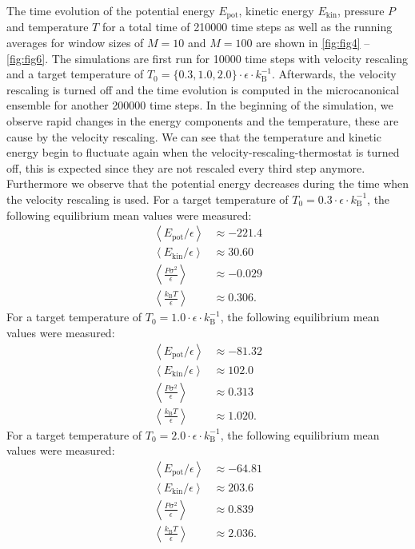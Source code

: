 \documentclass[a4paper,10pt,bibtotoc]{scrartcl}
\begin{document}
The time evolution of the potential energy $E_\mathrm{pot}$, kinetic energy $E_\mathrm{kin}$, pressure $P$ and temperature $T$ for a total time of 210000 time steps as well as the running averages for window sizes of $M=10$ and $M=100$ are shown in \autoref{fig:fig4} -- \autoref{fig:fig6}. 
The simulations are first run for 10000 time steps with velocity rescaling and a target temperature of $T_0 = \{0.3, 1.0, 2.0\}\cdot \epsilon\cdot k_\mathrm{B}^{-1}$. 
Afterwards, the velocity rescaling is turned off and the time evolution is computed in the microcanonical ensemble for another 200000 time steps.
In the beginning of the simulation, we observe rapid changes in the energy components and the temperature, these are cause by the velocity rescaling.
We can see that the temperature and kinetic energy begin to fluctuate again when the velocity-rescaling-thermostat is turned off, this is expected since they are not rescaled every third step anymore.
Furthermore we observe that the potential energy decreases during the time when the velocity rescaling is used.
For a target temperature of $T_0 = 0.3\cdot \epsilon\cdot k_\mathrm{B}^{-1}$, the following equilibrium mean values were measured:
\begin{align*}
\left\langle E_\mathrm{pot}/\epsilon \right\rangle &\approx-221.4\\
\left\langle E_\mathrm{kin}/\epsilon\right\rangle &\approx 30.60\\
\left\langle \frac{P\sigma ^2}{\epsilon}\right\rangle &\approx -0.029\\
\left\langle \frac{k_\mathrm{B}T}{\epsilon}\right\rangle &\approx 0.306.
\end{align*}
For a target temperature of $T_0 = 1.0\cdot \epsilon\cdot k_\mathrm{B}^{-1}$, the following equilibrium mean values were measured:
\begin{align*}
\left\langle E_\mathrm{pot}/\epsilon \right\rangle &\approx-81.32\\
\left\langle E_\mathrm{kin}/\epsilon\right\rangle &\approx 102.0\\
\left\langle \frac{P\sigma ^2}{\epsilon}\right\rangle &\approx0.313\\
\left\langle \frac{k_\mathrm{B}T}{\epsilon}\right\rangle &\approx 1.020.
\end{align*}
For a target temperature of $T_0 = 2.0\cdot \epsilon\cdot k_\mathrm{B}^{-1}$, the following equilibrium mean values were measured:
\begin{align*}
\left\langle E_\mathrm{pot}/\epsilon \right\rangle &\approx-64.81\\
\left\langle E_\mathrm{kin}/\epsilon\right\rangle &\approx 203.6\\
\left\langle \frac{P\sigma ^2}{\epsilon}\right\rangle &\approx 0.839\\
\left\langle \frac{k_\mathrm{B}T}{\epsilon}\right\rangle &\approx 2.036.
\end{align*}
\end{document}
